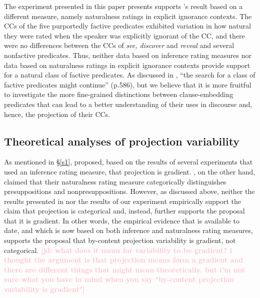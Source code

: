 \documentclass[11pt,fleqn]{article}
\newcommand{\jd}[1]{\textbf{\textcolor{Pink}{[jd: #1]}}}
\newcommand{\6}{\mbox{$[\hspace*{-.6mm}[$}}
\newcommand{\9}{\mbox{$]\hspace*{-.6mm}]$}}
\newcommand{\citepos}[1]{\citeauthor{#1}'s \citeyear{#1}}
\begin{document}
The experiment presented in this paper presents supports \citepos{degen-tonhauser-language} result based on a different measure, namely naturalness ratings in explicit ignorance contexts. The CCs of the five purportedly factive predicates exhibited variation in how natural they were rated when the speaker was explicitly ignorant of the CC, and there were no differences between the CCs of {\em see, discover} and {\em reveal} and several nonfactive predicates. Thus, neither data based on inference rating measures nor data based on naturalness ratings in explicit ignorance contexts provide support for a natural class of factive predicates. As discussed in \citealt{degen-tonhauser-language}, ``the search for a class of factive predicates might continue'' (p.586), but we believe that it is more fruitful to investigate the more fine-grained distinctions between clause-embedding predicates that can lead to a better understanding of their uses in discourse and, hence, the projection of their CCs.

\subsection{Theoretical analyses of projection variability}

\color{blue}

As mentioned in \S\ref{s1}, \citealt{tbd-variability} proposed, based on the results of several experiments that used an inference rating measure, that projection is gradient.  \citealt{mandelkern-etal2020}, on the other hand, claimed that their naturalness rating measure categorically distinguishes presuppositions and nonpresuppositions.  However, as discussed above, neither the results presented in \citealt{mandelkern-etal2020} nor the results of our experiment empirically support the claim that projection is categorical and, instead, further supports the proposal that it is gradient. In other words, the empirical evidence that is available to date, and which is now based on both inference and naturalness rating measures, supports the proposal that by-content projection variability is gradient, not categorical. \jd{what does it mean for variability to be gradient? i thought the argument is that projection means form a gradient and there are different things that might mean theoretically. but i'm not sure what you have in mind when you say "by-content projection variability is gradient"} 
\end{document}
